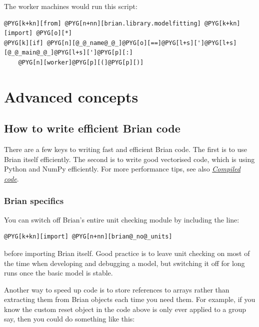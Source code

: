 \documentclass[letterpaper,10pt,english]{manual}
\begin{document}
The worker machines would run this script:

\begin{Verbatim}[commandchars=@\[\]]
@PYG[k+kn][from] @PYG[n+nn][brian.library.modelfitting] @PYG[k+kn][import] @PYG[o][*]
@PYG[k][if] @PYG[n][@_@_name@_@_]@PYG[o][==]@PYG[l+s][']@PYG[l+s][@_@_main@_@_]@PYG[l+s][']@PYG[p][:]
    @PYG[n][worker]@PYG[p][(]@PYG[p][)]
\end{Verbatim}

\resetcurrentobjects
\hypertarget{--doc-advanced}{}

\chapter{Advanced concepts}

\resetcurrentobjects
\hypertarget{--doc-efficient}{}

\hypertarget{index-3}{}\section{How to write efficient Brian code}

There are a few keys to writing fast and efficient Brian code. The
first is to use Brian itself efficiently. The second is to write
good vectorised code, which is using Python and NumPy efficiently.
For more performance tips, see also \hyperlink{compiled-code}{\emph{Compiled code}}.


\subsection{Brian specifics}

You can switch off Brian's entire unit checking module
by including the line:

\begin{Verbatim}[commandchars=@\[\]]
@PYG[k+kn][import] @PYG[n+nn][brian@_no@_units]
\end{Verbatim}

before importing Brian itself. Good practice is to leave unit checking
on most of the time when developing and debugging a model, but
switching it off for long runs once the basic model is stable.

Another way to speed up code is to store references to arrays rather
than extracting them from Brian objects each time you need them. For
example, if you know the custom reset object in the code above is
only ever applied to a group  say, then you could
do something like this:
\end{document}
